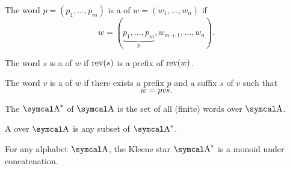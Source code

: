 \begin{definition}
\begin{DefEnum}
     The word \( p = (p_1, \ldots, p_m) \) is a  of \( w = (w_1, \ldots, w_n) \) if
    \begin{equation*}
      w = (\underbrace{p_1, \ldots, p_m}_p, w_{m+1}, \ldots, w_n).
    \end{equation*}

     The word \( s \) is a  of \( w \) if \( \operatorname{rev}(s) \) is a prefix of \( \operatorname{rev}(w) \).

     The word \( v \) is a  of \( w \) if there exists a prefix \( p \) and a suffix \( s \) of \( v \) such that
    \begin{equation*}
      w = pvs.
    \end{equation*}

     The  \( \CA^{\ast} \) of \( \CA \) is the set of all (finite) words over \( \CA \).

     A  over \( \CA \) is any subset of \( \CA^{\ast} \).
  \end{DefEnum}

\end{definition}

\begin{proposition}\label{thm:kleene_star_is_monoid}
  For any alphabet \( \CA \), the Kleene star \( \CA^{\ast} \) is a monoid under concatenation.
\end{proposition}
